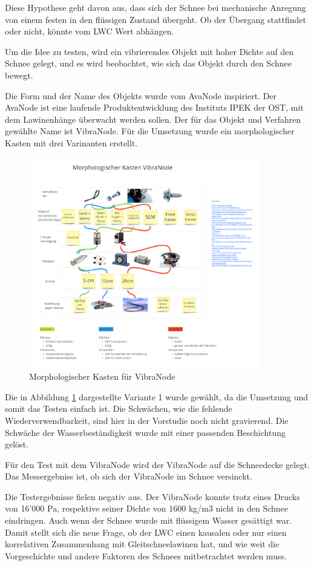 
Diese Hypothese geht davon aus, dass sich der Schnee bei mechanische Anregung von einem festen in den flüssigen Zustand übergeht. Ob der Übergang stattfindet oder nicht, könnte vom LWC Wert abhängen.

Um die Idee zu testen, wird ein vibrierendes Objekt mit hoher Dichte auf den Schnee gelegt, und es wird beobachtet, wie sich das Objekt durch den Schnee bewegt.

Die Form und der Name des Objekts wurde vom AvaNode inspiriert. Der AvaNode ist eine laufende Produktentwicklung des Instituts IPEK der OST, mit dem Lawinenhänge überwacht werden sollen. Der für das Objekt und Verfahren gewählte Name ist VibraNode. Für die Umsetzung wurde ein morphologischer Kasten mit drei Varinanten erstellt.


\begin{figure}[H]
    \centering
    \includegraphics[width=0.9\textwidth]{Bilder/Unbenann2t.PNG}
    \caption{Morphologischer Kasten für VibraNode}
    \label{fig:MorphKasten}
\end{figure}




Die in Abbildung \ref{fig:MorphKasten} dargestellte Variante 1 wurde gewählt, da die Umsetzung und somit das Testen einfach ist. Die Schwächen, wie die fehlende Wiederverwendbarkeit, sind hier in der Vorstudie noch nicht gravierend. Die Schwäche der Wasserbeständigkeit wurde mit einer passenden Beschichtung gelöst.

Für den Test mit dem VibraNode wird der VibraNode auf die Schneedecke gelegt. Das Messergebniss ist, ob sich der VibraNode im Schnee versinckt.

Die Testergebnisse fielen negativ aus. Der VibraNode konnte trotz eines Drucks von 16'000 Pa, respektive seiner Dichte von 1600 kg/m3 nicht in den Schnee eindringen. Auch wenn der Schnee wurde mit flüssigem Wasser gesättigt war. Damit  stellt sich die neue Frage, ob der LWC einen kausalen oder nur einen korrelativen Zusammenhang mit Gleitschneelawinen hat, und wie weit die Vorgeschichte und andere Faktoren des Schnees mitbetrachtet werden muss. \cite{Altman.2015}
